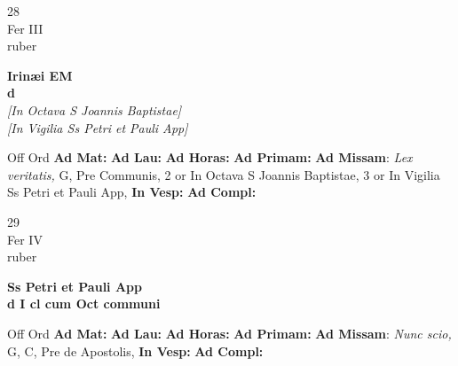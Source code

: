 \documentclass[10pt, openany]{book}
\begin{document}
    \begin{center}
        \begin{minipage}{3.5in}
            \vspace{2em}
            \begin{minipage}{0.5in}
                {\Huge 28} \\
                {\normalsize Fer III} \\
                {\normalsize ruber}
            \end{minipage}
            \begin{minipage}{3.0in}
                \textbf{ \large Irinæi EM \\
                \textnormal{\normalsize d}} \\ \textit{[In Octava S Joannis Baptistae]} \\ \textit{[In Vigilia Ss Petri et Pauli App]} \\ 
            \end{minipage}
            \begin{justify}Off Ord
                \textbf{Ad Mat: }
                \textbf{Ad Lau: }
                \textbf{Ad Horas: }
                \textbf{Ad Primam: }\textbf{Ad Missam}: \textit{Lex veritatis,} G, Pre Communis, 2 or In Octava S Joannis Baptistae, 3 or In Vigilia Ss Petri et Pauli App,  
                \textbf{In Vesp: }
                \textbf{Ad Compl: }
            \end{justify}
        \end{minipage}
    \end{center}

    \begin{center}
        \begin{minipage}{3.5in}
            \vspace{2em}
            \begin{minipage}{0.5in}
                {\Huge 29} \\
                {\normalsize Fer IV} \\
                {\normalsize ruber}
            \end{minipage}
            \begin{minipage}{3.0in}
                \textbf{ \large Ss Petri et Pauli App \\
                \textnormal{\normalsize d I cl cum Oct communi}} \\ 
            \end{minipage}
            \begin{justify}Off Ord
                \textbf{Ad Mat: }
                \textbf{Ad Lau: }
                \textbf{Ad Horas: }
                \textbf{Ad Primam: }\textbf{Ad Missam}: \textit{Nunc scio,} G, C, Pre de Apostolis,  
                \textbf{In Vesp: }
                \textbf{Ad Compl: }
            \end{justify}
        \end{minipage}
    \end{center}
\end{document}
